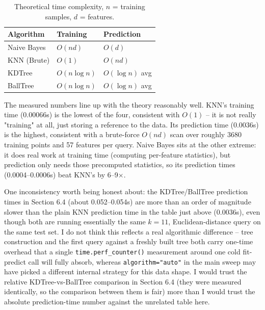 \documentclass[11pt,a4paper]{article}
\begin{document}
\begin{table}[h]
\centering
\begin{tabular}{@{}lll@{}}
\toprule
Algorithm & Training & Prediction \\
\midrule
Naive Bayes & $O(nd)$ & $O(d)$ \\
KNN (Brute) & $O(1)$ & $O(nd)$ \\
KDTree & $O(n \log n)$ & $O(\log n)$ avg \\
BallTree & $O(n \log n)$ & $O(\log n)$ avg \\
\bottomrule
\end{tabular}
\caption{Theoretical time complexity, $n$ = training samples, $d$ = features.}
\end{table}

The measured numbers line up with the theory reasonably well. KNN's training time (0.00066s) is the lowest of the four, consistent with $O(1)$ -- it is not really "training" at all, just storing a reference to the data. Its prediction time (0.0036s) is the highest, consistent with a brute-force $O(nd)$ scan over roughly 3680 training points and 57 features per query. Naive Bayes sits at the other extreme: it does real work at training time (computing per-feature statistics), but prediction only needs those precomputed statistics, so its prediction times (0.0004--0.0006s) beat KNN's by 6--9$\times$.

One inconsistency worth being honest about: the KDTree/BallTree prediction times in Section 6.4 (about 0.052--0.054s) are more than an order of magnitude slower than the plain KNN prediction time in the table just above (0.0036s), even though both are running essentially the same $k{=}11$, Euclidean-distance query on the same test set. I do not think this reflects a real algorithmic difference -- tree construction and the first query against a freshly built tree both carry one-time overhead that a single \texttt{time.perf\_counter()} measurement around one cold fit-predict call will fully absorb, whereas \texttt{algorithm="auto"} in the main sweep may have picked a different internal strategy for this data shape. I would trust the relative KDTree-vs-BallTree comparison in Section 6.4 (they were measured identically, so the comparison between them is fair) more than I would trust the absolute prediction-time number against the unrelated table here.
\end{document}
